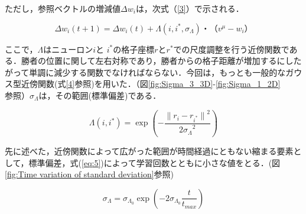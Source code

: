 ただし，参照ベクトルの増減値$\Delta w_i$は，次式（\ref{3}）で示される．

\begin{equation}
\label{3}
\Delta w_i(t +1) = \Delta w_i(t)+\Lambda(i,i^*,\sigma_\Lambda)・（v^\mu-w_i）
\end{equation}

ここで，$\Lambda$はニューロン$i$と $i^*$の格子座標$r$と$r^*$での尺度調整を行う近傍関数である．勝者の位置に関して左右対称であり，勝者からの格子距離が増加するにしたがって単調に減少する関数でなければならない．今回は，もっとも一般的なガウス型近傍関数(式\ref{4}参照)を用いた．（図\ref{fig:Sigma_3_3D}-\ref{fig:Sigma_1_2D}参照）$\sigma_\Lambda$は，その範囲(標準偏差)である．

\begin{equation}
\label{4}
\Lambda(i, i^*) = \exp(-\frac{{\|r_i-r_{i^*}\|}^2}{{2\sigma_\Lambda}^2})
\end{equation}

先に述べた，近傍関数によって広がった範囲が時間経過にともない縮まる要素として，標準偏差，式(\ref{eq:5})によって学習回数とともに小さな値をとる．(図\ref{fig:Time variation of standard deviation}参照)

\begin{equation}
\label{eq:5}
\sigma_\Lambda={\sigma_{\Lambda_0}}\exp(-2{\sigma_{\Lambda_0}}\frac{t}{t_{max}})
\end{equation}

